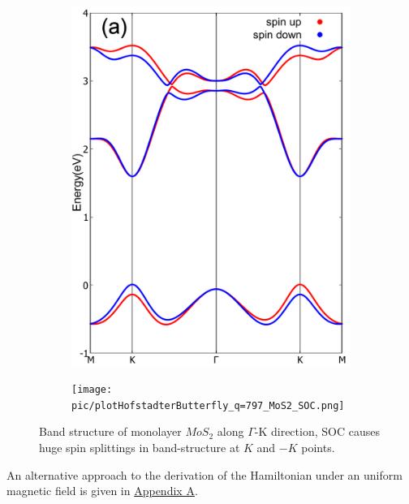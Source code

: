 \documentclass{report}
\begin{document}


\begin{figure}[htb]
	\begin{subfigure}[b]{0.495\textwidth}
		\centering
		\includegraphics[width=\linewidth]{pic/bandstructureSOC.pdf}
	\end{subfigure}
	\begin{subfigure}[b]{0.495\textwidth}
		\centering
		\texttt{[image: pic/plotHofstadterButterfly\_q=797\_MoS2\_SOC.png]}
	\end{subfigure}
	\caption[Hofstadter butterfly with SOC.]{Band structure of monolayer $MoS_{2}$ along $\Gamma$-K direction, SOC causes huge spin splittings in band-structure at $K$ and $-K$ points.}
\end{figure}

An alternative approach to the derivation of the Hamiltonian under an uniform magnetic field is given in \hyperref[appendix b]{Appendix A}.
\end{document}
